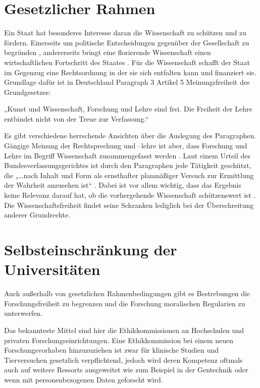 \documentclass{pmwk}
\begin{document}
\section*{Gesetzlicher Rahmen}
Ein Staat hat besonderes Interesse daran die Wissenschaft zu schützen und zu fördern. Einerseits um politische Entscheidungen gegenüber der Gesellschaft zu begründen \cite[11]{Huber}, andererseits bringt eine florierende Wissenschaft einen wirtschaftlichen Fortschritt des Staates \cite[35]{Huber}. Für die Wissenschaft schafft der Staat im Gegenzug eine Rechtsordnung in der sie sich entfalten kann und finanziert sie. Grundlage dafür ist in Deutschland Paragraph 3 Artikel 5 Meinungsfreiheit des Grundgesetzes:\par
„Kunst und Wissenschaft, Forschung und Lehre sind frei. Die Freiheit der Lehre entbindet nicht von der Treue zur Verfassung.“ \cite[Art 5 § 3]{gg}\par
Es gibt verschiedene herrschende Ansichten über die Auslegung des Paragraphen. Gängige Meinung der Rechtsprechung und –lehre ist aber, dass Forschung und Lehre im Begriff Wissenschaft zusammengefasst werden \cite[27]{RechFrei}. Laut einem Urteil des Bundesverfassungsgerichtes ist durch den Paragraphen jede Tätigkeit geschützt, die „…nach Inhalt und Form als ernsthafter planmäßiger Versuch zur Ermittlung der Wahrheit anzusehen ist“ \cite{bvg}. Dabei ist vor allem wichtig, dass das Ergebnis keine Relevanz darauf hat, ob die vorhergehende Wissenschaft schützenswert ist \cite[13]{WisArb}. Die Wissenschaftsfreiheit findet seine Schranken lediglich bei der Überschreitung anderer Grundrechte\cite[61]{Huber}.

\section*{Selbsteinschränkung der Universitäten}
Auch außerhalb von gesetzlichen Rahmenbedingungen gibt es Bestrebungen die Forschungsfreiheit zu begrenzen und die Forschung moralischen Regularien zu unterwerfen.\par

Das bekannteste Mittel sind hier die Ethikkommissionen an Hochschulen und privaten Forschungseinrichtungen. Eine Ethikkommission bei einem neuen Forschungsvorhaben hinzuzuziehen ist zwar für klinische Studien und Tierversuchen gesetzlich verpflichtend, jedoch wird deren Kompetenz oftmals auch auf weitere Ressorts ausgeweitet wie zum Beispiel in der Gentechnik oder wenn mit personenbezogenen Daten geforscht wird.\par
\end{document}
